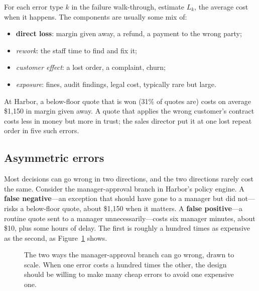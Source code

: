 For each error type $k$ in the failure walk-through, estimate $L_k$, the average cost when it happens. The components are usually some mix of:
\begin{itemize}[itemsep=1pt]
  \item \textbf{direct loss}: margin given away, a refund, a payment to the wrong party;
  \item \emph{rework}: the staff time to find and fix it;
  \item \emph{customer effect}: a lost order, a complaint, churn;
  \item \emph{exposure}: fines, audit findings, legal cost, typically rare but large.
\end{itemize}
At Harbor, a below-floor quote that is won (31\% of quotes are) costs on average \$1{,}150 in margin given away. A quote that applies the wrong customer's contract costs less in money but more in trust; the sales director put it at one lost repeat order in five such errors.

\subsection{Asymmetric errors}

Most decisions can go wrong in two directions, and the two directions rarely cost the same. Consider the manager-approval branch in Harbor's policy engine. A \textbf{false negative}---an exception that should have gone to a manager but did not---risks a below-floor quote, about \$1{,}150 when it matters. A \textbf{false positive}---a routine quote sent to a manager unnecessarily---costs six manager minutes, about \$10, plus some hours of delay. The first is roughly a hundred times as expensive as the second, as Figure~\ref{fig:asym} shows.

\begin{figure}[htbp]
\centering
{}
\caption{The two ways the manager-approval branch can go wrong, drawn to scale. When one error costs a hundred times the other, the design should be willing to make many cheap errors to avoid one expensive one.}
\label{fig:asym}
\end{figure}

